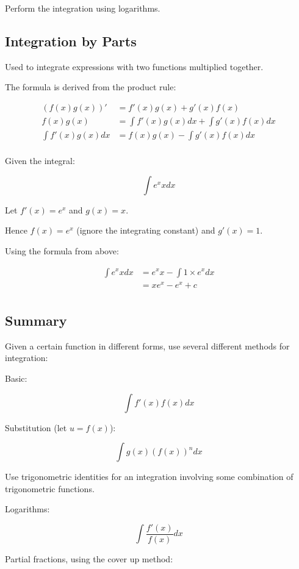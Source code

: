 \documentclass[a4paper,11pt]{article}
\begin{document}
Perform the integration using logarithms.


\subsection{Integration by Parts}

Used to integrate expressions with two functions multiplied together.

The formula is derived from the product rule:

$$
\begin{aligned}
(f(x)g(x))' & = f'(x)g(x) + g'(x)f(x) \\
f(x)g(x) & = \int f'(x)g(x) dx + \int g'(x)f(x) dx \\
\int f'(x)g(x) dx & = f(x)g(x) - \int g'(x)f(x) dx \\
\end{aligned}
$$

Given the integral:

$$
\int e^x x dx
$$

Let $f'(x) = e^x$ and $g(x) = x$.

Hence $f(x) = e^x$ (ignore the integrating constant) and $g'(x) = 1$.

Using the formula from above:

$$
\begin{aligned}
\int e^x x dx & = e^x x - \int 1 \times e^x dx \\
& = x e^x - e^x + c \\
\end{aligned}
$$


\subsection{Summary}

Given a certain function in different forms, use several different methods for
integration:

Basic:

$$
\int f'(x) f(x) dx
$$

Substitution (let $u = f(x)$):

$$
\int g(x) (f(x))^n dx
$$

Use trigonometric identities for an integration involving some combination of
trigonometric functions.

Logarithms:

$$
\int \frac{f'(x)}{f(x)} dx
$$

Partial fractions, using the cover up method:
\end{document}
